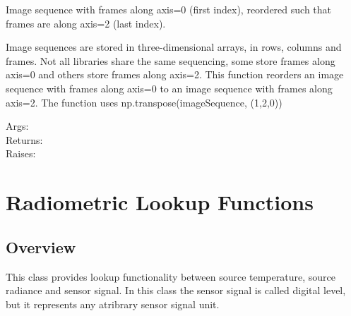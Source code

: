 \documentclass[a4paper,10pt,english]{sphinxmanual}
\begin{document}
\begin{fulllineitems}
\label{ryutils:pyradi.ryutils.framesLast}
Image sequence with frames along axis=0 (first index), reordered such that 
frames are along axis=2 (last index).

Image sequences are stored in three-dimensional arrays, in rows, columns and frames.
Not all libraries share the same sequencing, some store frames along axis=0 and 
others store frames along axis=2.  This function reorders an image sequence with 
frames along axis=0  to an image sequence with frames along axis=2.  The function
uses np.transpose(imageSequence, (1,2,0))
\begin{description}
\item[{Args:}] \leavevmode
{}

\item[{Returns:}] \leavevmode
{}

\item[{Raises:}] \leavevmode
{}

\end{description}

\end{fulllineitems}



\chapter{Radiometric Lookup Functions}
\label{rylookup:radiometric-lookup-functions}\label{rylookup::doc}

\section{Overview}
\label{rylookup:overview}\label{rylookup:module-pyradi.rylookup}
This class provides lookup functionality between source temperature, 
source radiance and sensor signal.  In this class the sensor signal is called 
digital level, but it represents any atribrary sensor signal unit.
\end{document}
